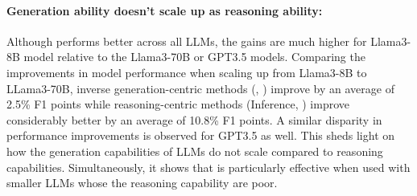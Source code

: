 \paragraph{Generation ability doesn't scale up as reasoning ability:}
Although \modelName{} performs better across all LLMs, the gains are much higher for Llama3-8B model relative to the Llama3-70B or GPT3.5 models.
Comparing the improvements in model performance when scaling up from Llama3-8B to LLama3-70B, inverse generation-centric methods (\starName, \modelName) improve by an average of 2.5\% F1 points while reasoning-centric methods (Inference, \extracttrain) improve considerably better by an average of 10.8\% F1 points.
A similar disparity in performance improvements is observed for GPT3.5 as well.
This sheds light on how the generation capabilities of LLMs do not scale compared to reasoning capabilities.
Simultaneously, it shows that \modelName{} is particularly effective when used with smaller LLMs whose the reasoning capability are poor.


